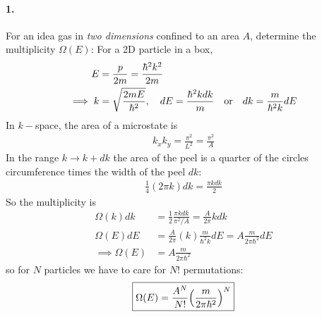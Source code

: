 \documentclass[../main.tex]{subfiles}
\begin{document}
\pagestyle{fancy}

\setcounter{section}{3}

\paragraph{1.} For an idea gas in \emph{two dimensions} confined to an area $A$, determine the multiplicity $\Omega(E)$:
For a 2D particle in a box,
\begin{align*}
    E &= \frac{p}{2m} = \frac{\hbar^2 k^2}{2m}  \\
    \implies k &= \sqrt{\frac{2mE}{\hbar^2}}, \quad dE = \frac{\hbar^2 k dk}{m} \qor dk = \frac{m}{\hbar^2 k} dE
\end{align*}
In $k-$space, the area of a microstate is
\begin{align*}
    k_x k_y = \frac{\pi^2}{L^2} = \frac{\pi^2}{A}
\end{align*}
In the range $k \to k + dk$ the area of the peel is a quarter of the circles circumference times the width of the peel $dk$:
\begin{align*}
    \frac{1}{4} (2\pi k) dk = \frac{\pi k dk}{2} 
\end{align*}
So the multiplicity is
\begin{align*}
    \Omega(k) dk &= \frac{1}{2} \frac{\pi k dk}{\pi^2 / A} = \frac{A}{2\pi} k dk \\
    \Omega(E) dE &= \frac{A}{2\pi} (k) \frac{m}{\hbar^2 k} dE = A \frac{m}{2\pi\hbar^2} dE \\
    \implies \Omega(E) &= A \frac{m}{2\pi\hbar^2}
\end{align*}
so for $N$ particles we have to care for $N!$ permutations:
\begin{align*}
    \boxed{\Omega(E) = \frac{A^N}{N!} \qt(\frac{m}{2\pi\hbar^2})^N}
\end{align*}

\newpage
\end{document}
